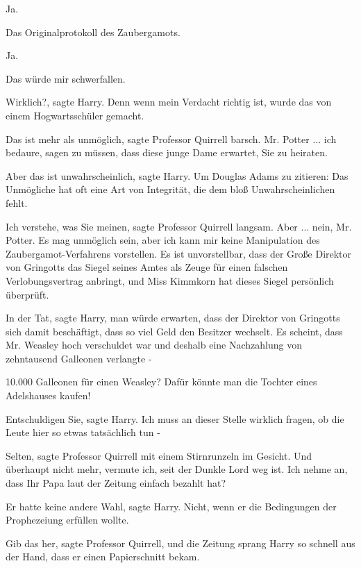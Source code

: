 \glqq{}Ja.\grqq{}

\glqq{}Das Originalprotokoll des Zaubergamots.\grqq{}

\glqq{}Ja.\grqq{}

\glqq{}Das würde mir schwerfallen.\grqq{}

\glqq{}Wirklich?\grqq{}, sagte Harry. \glqq{}Denn wenn mein Verdacht richtig
ist, wurde das von einem Hogwartsschüler gemacht.\grqq{}

\glqq{}Das ist mehr als unmöglich\grqq{}, sagte Professor Quirrell barsch.
\glqq{} Mr. Potter ... ich bedaure, sagen zu müssen, dass diese junge Dame
erwartet, Sie zu heiraten.\grqq{}

\glqq{}Aber das ist unwahrscheinlich\grqq{}, sagte Harry. \glqq{}Um Douglas
Adams zu zitieren: Das Unmögliche hat oft eine Art von Integrität, die dem bloß
Unwahrscheinlichen fehlt.\grqq{}

\glqq{}Ich verstehe, was Sie meinen\grqq{}, sagte Professor Quirrell langsam.
\glqq{}Aber ... nein, Mr. Potter. Es mag unmöglich sein, aber ich kann mir keine
Manipulation des Zaubergamot-Verfahrens vorstellen. Es ist unvorstellbar, dass
der Große Direktor von Gringotts das Siegel seines Amtes als Zeuge für einen
falschen Verlobungsvertrag anbringt, und Miss Kimmkorn hat dieses Siegel
persönlich überprüft.\grqq{}

\glqq{}In der Tat\grqq{}, sagte Harry, \glqq{}man würde erwarten, dass der
Direktor von Gringotts sich damit beschäftigt, dass so viel Geld den Besitzer
wechselt. Es scheint, dass Mr. Weasley hoch verschuldet war und deshalb eine
Nachzahlung von zehntausend Galleonen verlangte -\grqq{}

\glqq{}10.000 Galleonen für einen Weasley? Dafür könnte man die Tochter eines
Adelshauses kaufen!\grqq{}

\glqq{}Entschuldigen Sie\grqq{}, sagte Harry. \glqq{}Ich muss an dieser Stelle
wirklich fragen, ob die Leute hier so etwas tatsächlich tun -\grqq{}

\glqq{}Selten\grqq{}, sagte Professor Quirrell mit einem Stirnrunzeln im
Gesicht. \glqq{}Und überhaupt nicht mehr, vermute ich, seit der Dunkle Lord weg
ist. Ich nehme an, dass Ihr Papa laut der Zeitung einfach bezahlt hat?\grqq{}

\glqq{}Er hatte keine andere Wahl\grqq{}, sagte Harry. \glqq{}Nicht, wenn er die
Bedingungen der Prophezeiung erfüllen wollte.\grqq{}

\glqq{}Gib das her\grqq{}, sagte Professor Quirrell, und die Zeitung sprang
Harry so schnell aus der Hand, dass er einen Papierschnitt bekam.

